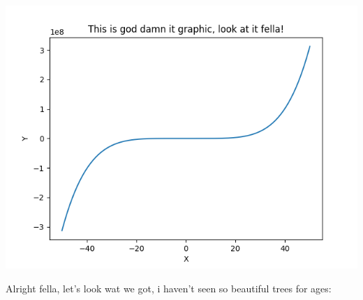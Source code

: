 \documentclass{article}
\begin{document}
    \begin{center} \includegraphics[scale=0.6]{function_graph.png} \end{center}Alright fella, let's look wat we got, i haven't seen so beautiful trees for ages:
\end{document}
